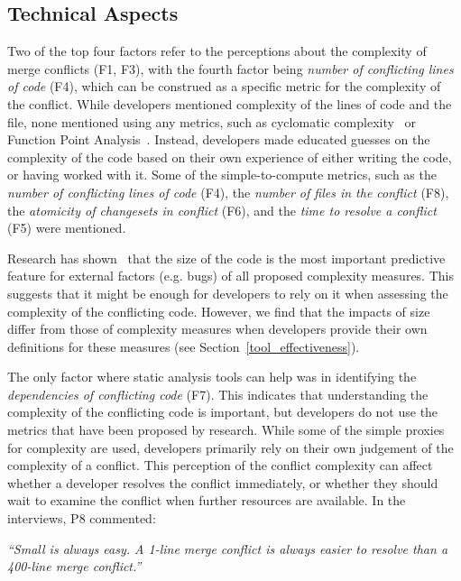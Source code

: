 \subsection{Technical Aspects}\label{artifact-based-factors}
Two of the top four factors refer to the perceptions about the complexity of merge conflicts (F1, F3), with the fourth factor being \textit{number of conflicting lines of code} (F4), which can be construed as a specific metric for the complexity of the conflict. 
While developers mentioned complexity of the lines of code and the file, none mentioned using any metrics, such as cyclomatic complexity~\cite{fenton2000quantitative,mccabe1976complexity} or Function Point Analysis~\cite{garmus2001fpa,symons1988function}. 
Instead, developers made educated guesses on the complexity of the code based on their own experience of either writing the code, or having worked with it. 
Some of the simple-to-compute metrics, such as the \textit{number of conflicting lines of code} (F4), the \textit{number of files in the conflict} (F8), the \textit{atomicity of changesets in conflict} (F6), and the \textit{time to resolve a conflict} (F5) were mentioned.

Research has shown~\cite{gil_correlation_2017} that the size of the code is the most important predictive feature for external factors (e.g. bugs) of all proposed complexity measures.
This suggests that it might be enough for developers to rely on it when assessing the complexity of the conflicting code.
However, we find that the impacts of size differ from those of complexity measures when developers provide their own definitions for these measures (see Section~\ref{tool_effectiveness}).

The only factor where static analysis tools can help was in identifying the \textit{dependencies of conflicting code} (F7).
This indicates that understanding the complexity of the conflicting code is important, but developers do not use the metrics that have been proposed by research.
While some of the simple proxies for complexity are used, developers primarily rely on their own judgement of the complexity of a conflict.
This perception of the conflict complexity can affect whether a developer resolves the conflict immediately, or whether they should wait to examine the conflict when further resources are available. In the interviews, P8 commented:
\begin{quoting}
\textit{``Small is always easy. A 1-line merge conflict is always easier to resolve than a 400-line merge conflict.''}
\end{quoting}

